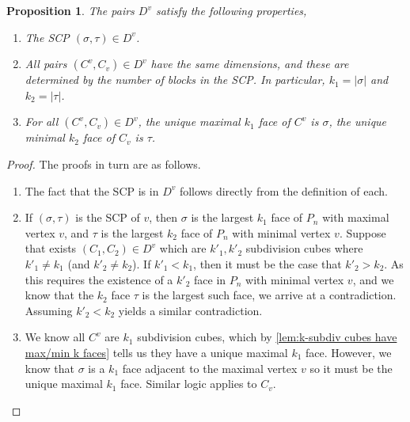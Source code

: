 \documentclass{amsart}
\newtheorem{proposition}[theorem]{Proposition}
\theoremstyle{definition}
\newcommand{\subdivpairsv}{D^v}
\begin{document}
\begin{proposition}\label{prop:ev properties}
The pairs $\subdivpairsv$ satisfy the following properties,
\begin{enumerate}
    \item The SCP $(\sigma,\tau) \in \subdivpairsv$.
    \item All pairs $(C^v,C_v) \in \subdivpairsv$ have the same dimensions, and these are determined by the number of blocks in the SCP. In particular, $k_1=|\sigma|$ and $k_2 = |\tau|$. 
    \item For all $(C^v,C_v) \in \subdivpairsv$, the unique maximal $k_1$ face of $C^v$ is $\sigma$, the unique minimal $k_2$ face of $C_v$ is $\tau$.
\end{enumerate}
\end{proposition}
\begin{proof}
The proofs in turn are as follows.
\begin{enumerate}
    \item The fact that the SCP is in $\subdivpairsv$ follows directly from the definition of each.
    \item If $(\sigma,\tau)$ is the SCP of $v$, then $\sigma$ is the largest $k_1$ face of $P_n$ with maximal vertex $v$, and $\tau$ is the largest $k_2$ face of $P_n$ with minimal vertex $v$.    
    Suppose that exists $(C_1,C_2) \in \subdivpairsv$ which are $k'_1, k'_2$ subdivision cubes where $k'_1\neq k_1$ (and $k'_2\neq k_2$).
    If $k'_1< k_1$, then it must be the case that $k'_2> k_2$.
    As this requires the existence of a $k'_2$ face in $P_n$ with minimal vertex $v$, and we know that the $k_2$ face $\tau$ is the largest such face, we arrive at a contradiction.
    Assuming $k'_2<k_2$ yields a similar contradiction.
    \item We know all $C^v$ are $k_1$ subdivision cubes, which by \cref{lem:k-subdiv cubes have max/min k faces} tells us they have a unique maximal $k_1$ face.
    However, we know that $\sigma$ is a $k_1$ face adjacent to the maximal vertex $v$ so it must be the unique maximal $k_1$ face.
    Similar logic applies to $C_v$.
\end{enumerate}
\end{proof}
\end{document}
